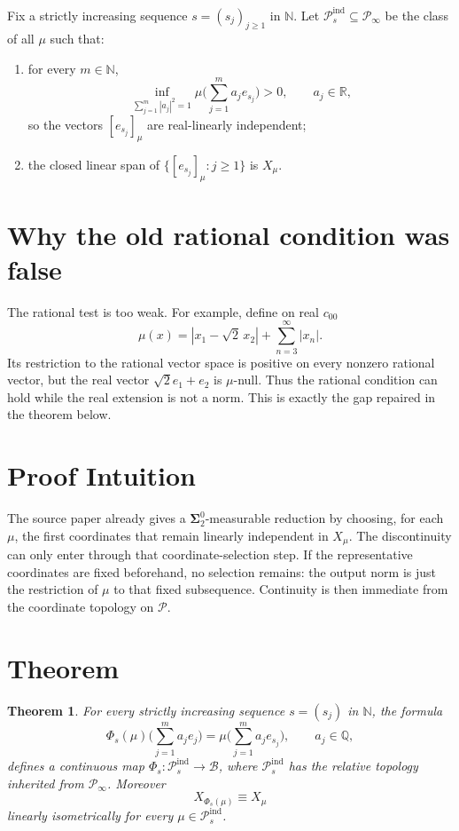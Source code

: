\documentclass[11pt]{article}
\newtheorem{theorem}{Theorem}
\newcommand{\PP}{\mathcal P}
\newcommand{\BB}{\mathcal B}
\newcommand{\Nat}{\mathbb N}
\newcommand{\Rat}{\mathbb Q}
\newcommand{\Real}{\mathbb R}
\begin{document}
Fix a strictly increasing sequence \(s=(s_j)_{j\ge1}\) in \(\Nat\). Let
\(\PP_s^{\mathrm{ind}}\subseteq\PP_\infty\) be the class of all \(\mu\)
such that:
\begin{enumerate}
\item for every \(m\in\Nat\),
\[
\inf_{\sum_{j=1}^m |a_j|^2=1}
\mu\Big(\sum_{j=1}^m a_j e_{s_j}\Big)>0,
\qquad a_j\in\Real,
\]
so the vectors \([e_{s_j}]_\mu\) are real-linearly independent;
\item the closed linear span of \(\{[e_{s_j}]_\mu:j\ge1\}\) is \(X_\mu\).
\end{enumerate}

\section*{Why the old rational condition was false}

The rational test is too weak.  For example, define on real \(c_{00}\)
\[
\mu(x)=|x_1-\sqrt2\,x_2|+\sum_{n=3}^\infty |x_n|.
\]
Its restriction to the rational vector space is positive on every nonzero
rational vector, but the real vector \(\sqrt2 e_1+e_2\) is \(\mu\)-null.
Thus the rational condition can hold while the real extension is not a norm.
This is exactly the gap repaired in the theorem below.

\section*{Proof Intuition}

The source paper already gives a \(\boldsymbol{\Sigma}^0_2\)-measurable
reduction by choosing, for each \(\mu\), the first coordinates that remain
linearly independent in \(X_\mu\). The discontinuity can only enter through
that coordinate-selection step. If the representative coordinates are fixed
beforehand, no selection remains: the output norm is just the restriction of
\(\mu\) to that fixed subsequence. Continuity is then immediate from the
coordinate topology on \(\PP\).

\section*{Theorem}

\begin{theorem}
For every strictly increasing sequence \(s=(s_j)\) in \(\Nat\), the formula
\[
\Phi_s(\mu)\Big(\sum_{j=1}^m a_j e_j\Big)
 =
\mu\Big(\sum_{j=1}^m a_j e_{s_j}\Big),
\qquad a_j\in\Rat,
\]
defines a continuous map \(\Phi_s:\PP_s^{\mathrm{ind}}\to\BB\), where
\(\PP_s^{\mathrm{ind}}\) has the
relative topology inherited from \(\PP_\infty\). Moreover
\[
X_{\Phi_s(\mu)}\equiv X_\mu
\]
linearly isometrically for every \(\mu\in\PP_s^{\mathrm{ind}}\).
\end{theorem}
\end{document}
